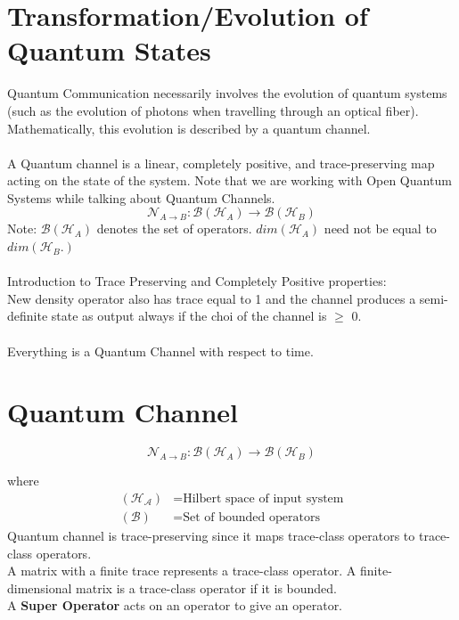 \documentclass{article}
\begin{document}
\section{Transformation/Evolution of Quantum States}

Quantum Communication necessarily involves the evolution
of quantum systems (such as the evolution of photons when travelling through
an optical fiber). Mathematically, this evolution is described by a
quantum channel.
\\
\\
A Quantum channel is a linear, completely positive, and trace-preserving map acting on the state of the system. Note that we are working with Open Quantum Systems while talking about Quantum Channels.
\\
\[\mathcal{N}_{A \rightarrow B} : \mathcal{B}(\mathcal{H}_{A}) \rightarrow \mathcal{B}(\mathcal{H}_{B})\]
Note: $\mathcal{B}(\mathcal{H}_{A})$ denotes the set of operators.
$dim(\mathcal{H}_{A})$ need not be equal to $dim(\mathcal{H}_{B}.)$
\\
\\
Introduction to Trace Preserving and Completely Positive properties:
\\
New density operator also has trace equal to 1 and the channel produces a semi-definite state as output always if the choi of the channel is $\ge$ 0.
\\
\\
Everything is a Quantum Channel with respect to time.

\section{Quantum Channel}
\[
	\mathcal{N}_{A \rightarrow B} : \mathcal{B}(\mathcal{H}_{A}) \rightarrow \mathcal{B}(\mathcal{H}_{B})
\]

where
\begin{align*}
	(\mathcal{H _{A}}) &= \text{Hilbert space of input system} \\
	(\mathcal{B}) &= \text{Set of bounded operators}
\end{align*}
Quantum channel is trace-preserving since it maps trace-class operators to trace-class operators.
\\
\small
A matrix with a finite trace represents a trace-class operator.
A finite-dimensional matrix is a trace-class operator if it is bounded.
\\
\normalsize
A \textbf{Super Operator} acts on an operator to give an operator.
\end{document}
